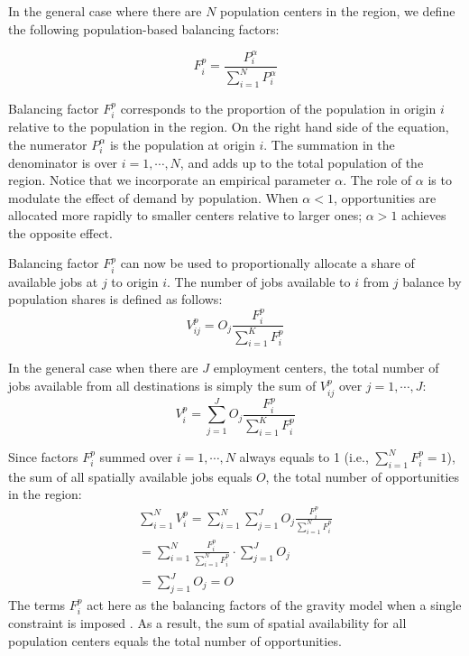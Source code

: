 \documentclass[]{elsarticle} %
\begin{document}
In the general case where there are \(N\) population centers in the
region, we define the following population-based balancing factors:

\begin{equation}
\label{eq:pop-alloc-factor}
F^p_{i} = \frac{P_{i}^\alpha}{\sum_{i=1}^N P_{i}^\alpha}
\end{equation}

Balancing factor \(F^p_{i}\) corresponds to the proportion of the
population in origin \(i\) relative to the population in the region. On
the right hand side of the equation, the numerator \(P_{i}^\alpha\) is
the population at origin \(i\). The summation in the denominator is over
\(i=1,\cdots,N\), and adds up to the total population of the region.
Notice that we incorporate an empirical parameter \(\alpha\). The role
of \(\alpha\) is to modulate the effect of demand by population. When
\(\alpha <1\), opportunities are allocated more rapidly to smaller
centers relative to larger ones; \(\alpha>1\) achieves the opposite
effect.

Balancing factor \(F^p_{i}\) can now be used to proportionally allocate
a share of available jobs at \(j\) to origin \(i\). The number of jobs
available to \(i\) from \(j\) balance by population shares is defined as
follows: \[
V^p_{ij} = O_j\frac{F^p_{i}}{\sum_{i=1}^K F^p_{i}}
\]

In the general case when there are \(J\) employment centers, the total
number of jobs available from all destinations is simply the sum of
\(V^p_{ij}\) over \(j=1,\cdots, J\): \[
V^p_{i} = \sum_{j=1}^J O_j\frac{F^p_{i}}{\sum_{i=1}^K F^p_{i}}
\]

Since factors \(F^p_{i}\) summed over \(i=1,\cdots,N\) always equals to
1 (i.e., \(\sum_{i=1}^{N} F^p_{i} = 1\)), the sum of all spatially
available jobs equals \(O\), the total number of opportunities in the
region: \[
\begin{array}{l}
\sum_{i=1}^N V^p_i =\sum_{i=1}^N\sum_{j=1}^JO_j\frac{F^p_{i}}{\sum_{i=1}^N F^p_{i}}\\
=\sum_{i=1}^N \frac{F^p_{i}}{\sum_{i=1}^N F^p_{i}}\cdot\sum_{j=1}^JO_j\\
=\sum_{j=1}^J O_j = O
\end{array}
\] The terms \(F^p_{i}\) act here as the balancing factors of the
gravity model when a single constraint is imposed \citep[i.e., to ensure
that the sums of columns are equal to the number of opportunities per
destination, see][pp.~179-180 and 183-184]{ortuzar_2011_modelling}. As a
result, the sum of spatial availability for all population centers
equals the total number of opportunities.
\end{document}
